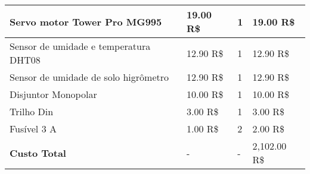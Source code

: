 \begin{table}[!htbp]
\begin{center}
\begin{tabular}{|p{4cm}|p{4cm}|p{3cm}|p{4cm}|}
Servo motor Tower Pro MG995 & 19.00 R\$ & 1 & 19.00 R\$\\\hline
Sensor de umidade e temperatura DHT08 & 12.90 R\$ & 1 & 12.90 R\$\\\hline
Sensor de umidade de solo higrômetro & 12.90 R\$ & 1 & 12.90 R\$\\\hline
Disjuntor Monopolar & 10.00 R\$ & 1 & 10.00 R\$\\\hline
Trilho Din & 3.00 R\$ & 1 & 3.00 R\$\\\hline
Fusível 3 A & 1.00 R\$ & 2 & 2.00 R\$\\\hline\hline
\textbf{Custo Total} & - & - & 2,102.00 R\$\\\hline
\end{tabular}
\end{center}
\end{table}
